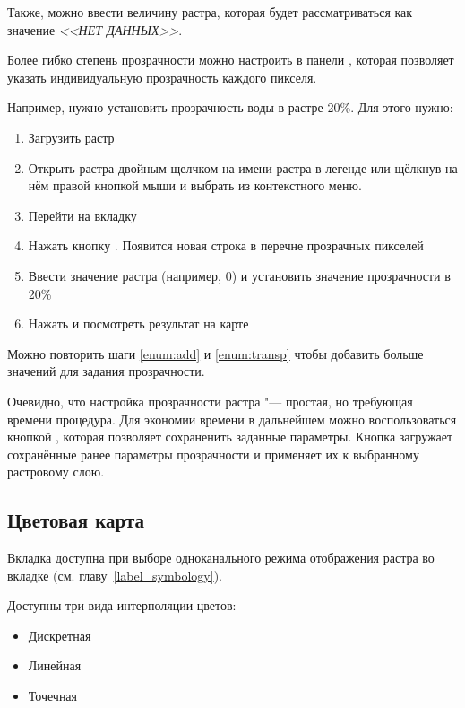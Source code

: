 Также, можно ввести величину растра, которая будет рассматриваться
как значение {\em <<НЕТ ДАННЫХ>>}.

Более гибко степень прозрачности можно настроить в панели
, которая позволяет указать индивидуальную
прозрачность каждого пикселя.

Например, нужно установить прозрачность воды в растре
 20\%. Для этого нужно:
\begin{enumerate}
 \item Загрузить растр 
 \item Открыть  растра двойным щелчком на имени растра в легенде
 или щёлкнув на нём правой кнопкой мыши и выбрать 
 из контекстного меню.
 \item Перейти на вкладку 
 \item \label{enum:add} Нажать кнопку
 . Появится
 новая строка в перечне прозрачных пикселей
 \item \label{enum:transp} Ввести значение растра (например, 0) и
 установить значение прозрачности в 20\%
 \item Нажать  и посмотреть результат на карте
\end{enumerate}

Можно повторить шаги \ref{enum:add} и \ref{enum:transp} чтобы добавить
больше значений для задания прозрачности.

Очевидно, что настройка прозрачности растра "--- простая, но требующая времени
процедура. Для экономии времени в дальнейшем можно воспользоваться кнопкой
, которая позволяет сохраненить заданные
параметры. Кнопка 
загружает сохранённые ранее параметры прозрачности и применяет их к
выбранному растровому слою.

\subsection{Цветовая карта} \label{label_colormaptab}

Вкладка  доступна при выборе одноканального режима
отображения растра во вкладке  (см. главу~\ref{label_symbology}).

Доступны три вида интерполяции цветов:
\begin{itemize}[label=--]
\item Дискретная
\item Линейная
\item Точечная
\end{itemize}

